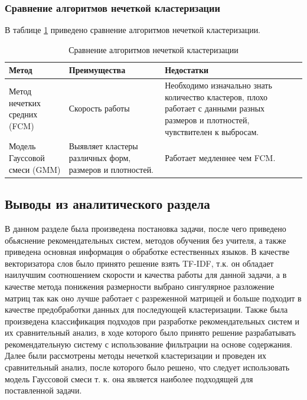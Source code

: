 \subsubsection{Сравнение алгоритмов нечеткой кластеризации}

В таблице \ref{cluster_table} приведено сравнение алгоритмов нечеткой кластеризации.

\begin{table}[H]
	\caption{Сравнение алгоритмов нечеткой кластеризации}
	\label{cluster_table}
	\begin{center}
		\begin{tabularx}{1\textwidth}{ 
				| >{\raggedright\arraybackslash}X 
				| >{\centering\arraybackslash}X 
				| >{\centering\arraybackslash}X | }
			\hline
			Метод & Преимущества & Недостатки \\ 
			\hline
			Метод нечетких средних (FCM) & Скорость работы & Необходимо изначально знать количество кластеров, плохо работает с данными разных размеров и плотностей, чувствителен к выбросам. \\ 
			\hline
			Модель Гауссовой смеси (GMM) & Выявляет кластеры различных форм, размеров и плотностей. & Работает медленнее чем FCM. \\ 
			\hline
		\end{tabularx}
	\end{center}
\end{table}

\subsection{Выводы из аналитического раздела}

В данном разделе была произведена постановка задачи, после чего приведено обьяснение рекомендательных систем, методов обучения без учителя, а также приведена основная информация о обработке естественных языков. В качестве векторизатора слов было принято решение взять TF-IDF, т.к. он обладает наилучшим соотношением скорости и качества работы для данной задачи, а в качестве метода понижения размерности выбрано сингулярное разложение матриц так как оно лучше работает с разреженной матрицей и больше подходит в качестве предобработки данных для последующей кластеризации. Также была произведена классификация подходов при разработке рекомендательных систем и их сравнительный анализ, в ходе которого было принято решение разрабатывать рекомендательную систему с использование фильтрации на основе содержания. Далее были рассмотрены методы нечеткой кластеризации и проведен их сравнительный анализ, после которого было решено, что следует использовать модель Гауссовой смеси т. к. она является наиболее подходящей для поставленной задачи.

\pagebreak